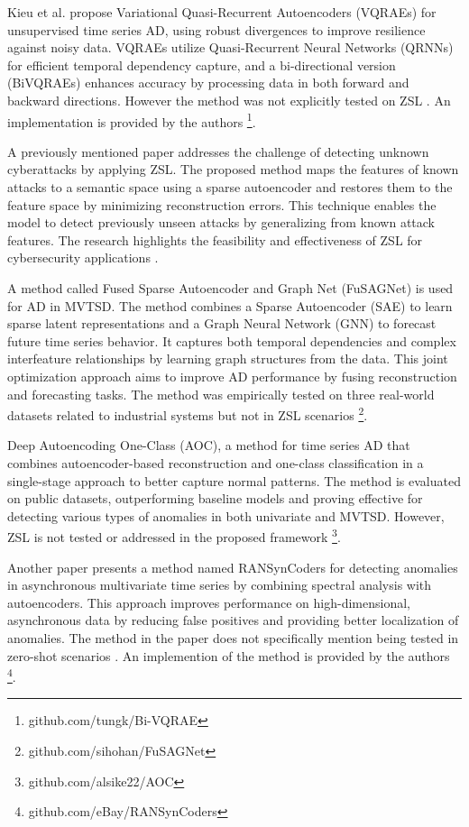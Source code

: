 Kieu et al. propose Variational Quasi-Recurrent Autoencoders (VQRAEs) for unsupervised time series AD, using robust divergences to improve resilience against noisy data. VQRAEs utilize Quasi-Recurrent Neural Networks (QRNNs) for efficient temporal dependency capture, and a bi-directional version (BiVQRAEs) enhances accuracy by processing data in both forward and backward directions. However the method was not explicitly tested on ZSL \cite{kieu_anomaly_2022}. An implementation is provided by the authors \footnote{\fussy\tiny github.com/tungk/Bi-VQRAE}.

A previously mentioned paper addresses the challenge of detecting unknown cyberattacks by applying ZSL. The proposed method maps the features of known attacks to a semantic space using a sparse autoencoder and restores them to the feature space by minimizing reconstruction errors. This technique enables the model to detect previously unseen attacks by generalizing from known attack features. The research highlights the feasibility and effectiveness of ZSL for cybersecurity applications \cite{zhang_unknown_2020}.

A method called Fused Sparse Autoencoder and Graph Net (FuSAGNet) is used for AD in MVTSD. The method combines a Sparse Autoencoder (SAE) to learn sparse latent representations and a Graph Neural Network (GNN) to forecast future time series behavior. It captures both temporal dependencies and complex interfeature relationships by learning graph structures from the data. This joint optimization approach aims to improve AD performance by fusing reconstruction and forecasting tasks. The method was empirically tested on three real-world datasets related to industrial systems but not in ZSL scenarios \cite{han_learning_2022} \footnote{\fussy\tiny github.com/sihohan/FuSAGNet}.

Deep Autoencoding One-Class (AOC), a method for time series AD that combines autoencoder-based reconstruction and one-class classification in a single-stage approach to better capture normal patterns. The method is evaluated on public datasets, outperforming baseline models and proving effective for detecting various types of anomalies in both univariate and MVTSD. However, ZSL is not tested or addressed in the proposed framework \cite{mou_deep_2023} \footnote{\fussy\tiny github.com/alsike22/AOC}.

Another paper presents a method named RANSynCoders for detecting anomalies in asynchronous multivariate time series by combining spectral analysis with autoencoders. This approach improves performance on high-dimensional, asynchronous data by reducing false positives and providing better localization of anomalies. The method in the paper does not specifically mention being tested in zero-shot scenarios \cite{abdulaal_practical_2021}. An implemention of the method is provided by the authors \footnote{\fussy\tiny github.com/eBay/RANSynCoders}.

